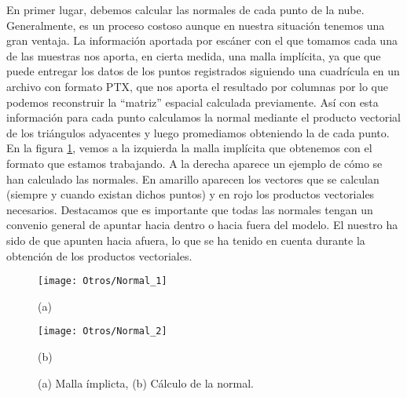 En primer lugar, debemos calcular las normales de cada punto de la nube. Generalmente, es un proceso costoso aunque en nuestra  situación tenemos una gran ventaja. La información aportada por escáner con el que tomamos cada una de las muestras nos aporta, en cierta medida, una malla implícita, ya que que puede entregar los datos de los puntos registrados siguiendo una cuadrícula en un archivo con formato PTX, que nos aporta el resultado por columnas por lo que podemos reconstruir la ``matriz'' espacial calculada previamente. Así con esta información para cada punto calculamos la normal mediante el producto vectorial de los triángulos adyacentes y luego promediamos obteniendo la de cada punto. En la figura \ref{Malla}, vemos a la izquierda la malla implícita que obtenemos con el formato que estamos trabajando. A la derecha aparece un ejemplo de cómo se han calculado las normales. En amarillo aparecen los vectores que se calculan (siempre y cuando existan dichos puntos) y en rojo los productos vectoriales necesarios. Destacamos que es importante que todas las normales tengan un convenio general de apuntar hacia dentro o hacia fuera del modelo. El nuestro ha sido de que apunten hacia afuera, lo que se ha tenido en cuenta durante la obtención de los productos vectoriales. \\

\begin{figure}[h!]
	
	\begin{minipage}{0.5\textwidth}
		\centering
		\texttt{[image: Otros/Normal\_1]} 
		\caption*{(a)}
	\end{minipage}
	\begin{minipage}{0.5\textwidth}
		\texttt{[image: Otros/Normal\_2]}
		\caption*{(b)}
	\end{minipage}
	\caption{(a) Malla ímplicta, (b) Cálculo de la normal.}
	\label{Malla}
\end{figure}

